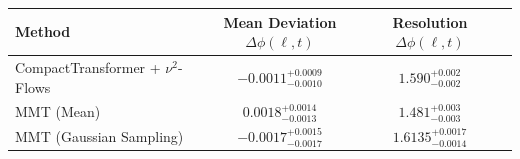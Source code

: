     \begin{tabular}{lccc}
        \toprule
        Method & Mean Deviation $\Delta\phi(\ell, t)$ & Resolution $\Delta\phi(\ell, t)$ \\
        \midrule
        CompactTransformer + $\nu^2$-Flows & $-0.0011^{+0.0009}_{-0.0010}$ & $1.590^{+0.002}_{-0.002}$ \\
        MMT (Mean) & $0.0018^{+0.0014}_{-0.0013}$ & $1.481^{+0.003}_{-0.003}$ \\
        MMT (Gaussian Sampling) & $-0.0017^{+0.0015}_{-0.0017}$ & $1.6135^{+0.0017}_{-0.0014}$ \\
        \bottomrule
    \end{tabular}